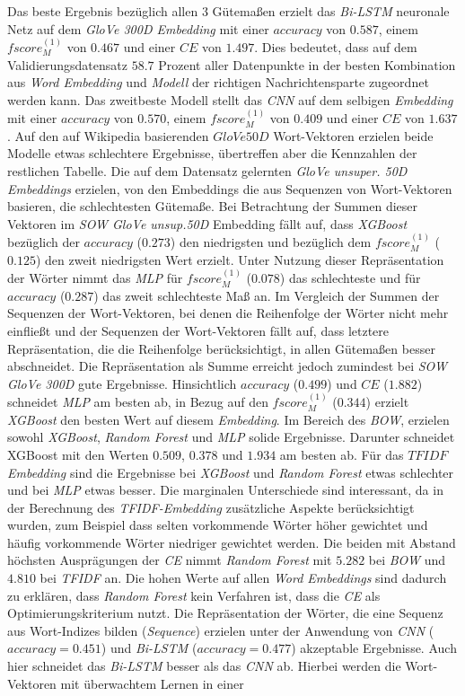 \documentclass[a4paper,11pt]{article}
\begin{document}
Das beste Ergebnis bezüglich allen $3$ Gütemaßen erzielt das \textit{Bi-LSTM} neuronale Netz auf dem \textit{GloVe 300D Embedding} mit einer $accuracy$ von $0.587$, einem $fscore_M^{(1)}$ von $0.467$ und einer $CE$ von $1.497$. Dies bedeutet, dass auf dem Validierungsdatensatz $58.7$ Prozent aller Datenpunkte in der besten Kombination aus \textit{Word Embedding} und \textit{Modell} der richtigen Nachrichtensparte zugeordnet werden kann. Das zweitbeste Modell stellt das \textit{CNN} auf dem selbigen \textit{Embedding} mit einer $accuracy$ von $0.570$, einem $fscore_M^{(1)}$ von $0.409$ und einer $CE$ von $1.637$. Auf den auf Wikipedia basierenden $GloVe 50D$ Wort-Vektoren erzielen beide Modelle etwas schlechtere Ergebnisse, übertreffen aber die Kennzahlen der restlichen Tabelle. Die auf dem Datensatz gelernten \textit{GloVe unsuper. 50D} \textit{Embeddings} erzielen, von den Embeddings die aus Sequenzen von Wort-Vektoren basieren, die schlechtesten Gütemaße. Bei Betrachtung der Summen dieser Vektoren im \textit{SOW GloVe unsup.50D} Embedding fällt auf, dass \textit{XGBoost} bezüglich der $accuracy$ ($0.273$) den niedrigsten und bezüglich dem $fscore_M^{(1)}$ ($0.125$) den zweit niedrigsten Wert erzielt. Unter Nutzung dieser Repräsentation der Wörter nimmt das \textit{MLP} für $fscore_M^{(1)}$ ($0.078$) das schlechteste und für $accuracy$ ($0.287$) das zweit schlechteste Maß an. Im Vergleich der Summen der Sequenzen der Wort-Vektoren, bei denen die Reihenfolge der Wörter nicht mehr einfließt und der Sequenzen der Wort-Vektoren fällt auf, dass letztere Repräsentation, die die Reihenfolge berücksichtigt, in allen Gütemaßen besser abschneidet. Die Repräsentation als Summe erreicht jedoch zumindest bei \textit{SOW GloVe 300D} gute Ergebnisse. Hinsichtlich $accuracy$ ($0.499$) und $CE$ ($1.882$) schneidet \textit{MLP} am besten ab, in Bezug auf den $fscore_M^{(1)}$ ($0.344$) erzielt \textit{XGBoost} den besten Wert auf diesem \textit{Embedding}. Im Bereich des \textit{BOW}, erzielen sowohl \textit{XGBoost}, \textit{Random Forest} und \textit{MLP} solide Ergebnisse. Darunter schneidet XGBoost mit den Werten $0.509$, $0.378$ und $1.934$ am besten ab. Für das $TFIDF$ \textit{Embedding} sind die Ergebnisse bei \textit{XGBoost} und \textit{Random Forest} etwas schlechter und bei \textit{MLP} etwas besser. Die marginalen Unterschiede sind interessant, da in der Berechnung des \textit{TFIDF-Embedding} zusätzliche Aspekte berücksichtigt wurden, zum Beispiel dass selten vorkommende Wörter höher gewichtet und häufig vorkommende Wörter niedriger gewichtet werden. Die beiden mit Abstand höchsten Ausprägungen der \textit{CE} nimmt \textit{Random Forest} mit $5.282$ bei \textit{BOW} und $4.810$ bei \textit{TFIDF} an. Die hohen Werte auf allen \textit{Word Embeddings} sind dadurch zu erklären, dass \textit{Random Forest} kein Verfahren ist, dass die \textit{CE} als Optimierungskriterium nutzt. Die Repräsentation der Wörter, die eine Sequenz aus Wort-Indizes bilden (\textit{Sequence}) erzielen unter der Anwendung von \textit{CNN} ($accuracy = 0.451$) und \textit{Bi-LSTM} ($accuracy = 0.477$) akzeptable Ergebnisse. Auch hier schneidet das \textit{Bi-LSTM} besser als das \textit{CNN} ab. Hierbei werden die Wort-Vektoren mit überwachtem Lernen in einer 
\end{document}

